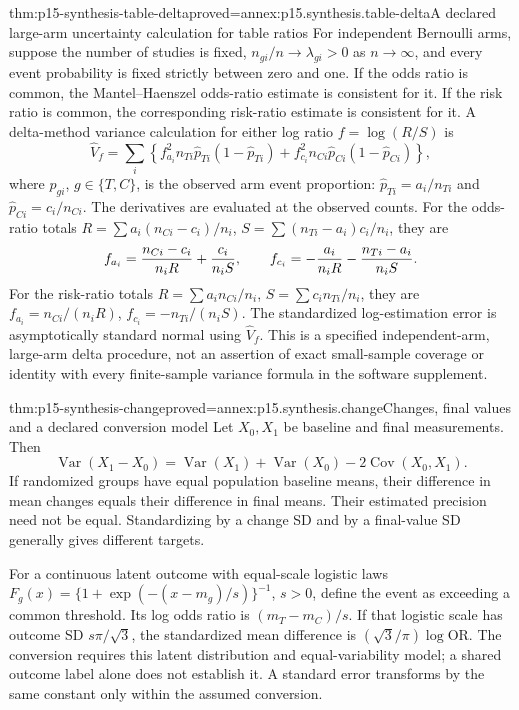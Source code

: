 \begin{hbtheorem}{thm:p15-synthesis-table-delta}{proved=annex:p15.synthesis.table-delta}{A declared large-arm uncertainty calculation for table ratios}
For independent Bernoulli arms, suppose the number of studies is fixed,
\(n_{gi}/n\to\lambda_{gi}>0\) as \(n\to\infty\), and every
event probability is fixed strictly between zero and one. If the odds ratio
is common, the Mantel--Haenszel odds-ratio estimate is consistent for it.
If the risk ratio is common, the corresponding risk-ratio estimate is
consistent for it. A delta-method variance calculation for either log ratio
\(f=\log(R/S)\) is
\[
 \widehat V_f=\sum_i\left\{
       f_{a_i}^2 n_{Ti}\widehat p_{Ti}(1-\widehat p_{Ti})
      +f_{c_i}^2 n_{Ci}\widehat p_{Ci}(1-\widehat p_{Ci})\right\},
\]
where \(\widehat p_{gi}\), \(g\in\{T,C\}\), is the observed arm
event proportion: \(\widehat p_{Ti}=a_i/n_{Ti}\) and
\(\widehat p_{Ci}=c_i/n_{Ci}\). The derivatives are evaluated
at the observed counts. For the odds-ratio totals
\(R=\sum a_i(n_{Ci}-c_i)/n_i\),
\(S=\sum(n_{Ti}-a_i)c_i/n_i\), they are
\[
 f_{a_i}={n_{Ci}-c_i\over n_iR}+{c_i\over n_iS},\qquad
 f_{c_i}=-{a_i\over n_iR}-{n_{Ti}-a_i\over n_iS}.
\]
For the risk-ratio totals \(R=\sum a_in_{Ci}/n_i\),
\(S=\sum c_in_{Ti}/n_i\), they are
\(f_{a_i}=n_{Ci}/(n_iR)\), \(f_{c_i}=-n_{Ti}/(n_iS)\).
The standardized log-estimation error is asymptotically standard normal
using \(\widehat V_f\). This is a specified independent-arm, large-arm
delta procedure, not an assertion of exact small-sample coverage or identity
with every finite-sample variance formula in the software supplement.
\end{hbtheorem}

\begin{hbtheorem}{thm:p15-synthesis-change}{proved=annex:p15.synthesis.change}{Changes, final values and a declared conversion model}
Let \(X_0,X_1\) be baseline and final measurements. Then
\[
 \operatorname{Var}(X_1-X_0)
 =\operatorname{Var}(X_1)+\operatorname{Var}(X_0)
                   -2\operatorname{Cov}(X_0,X_1).
\]
If randomized groups have equal population baseline means, their difference
in mean changes equals their difference in final means. Their estimated
precision need not be equal. Standardizing by a change SD and by a final-value
SD generally gives different targets.

For a continuous latent outcome with equal-scale logistic laws
\(F_g(x)=\{1+\exp(-(x-m_g)/s)\}^{-1}\), \(s>0\), define the
event as exceeding a common threshold. Its log odds ratio is
\((m_T-m_C)/s\). If that logistic scale has outcome SD
\(s\pi/\sqrt3\), the standardized mean difference is
\((\sqrt3/\pi)\log\mathrm{OR}\). The conversion requires this
latent distribution and equal-variability model; a shared outcome label alone
does not establish it. A standard error transforms by the same constant only
within the assumed conversion.
\end{hbtheorem}

